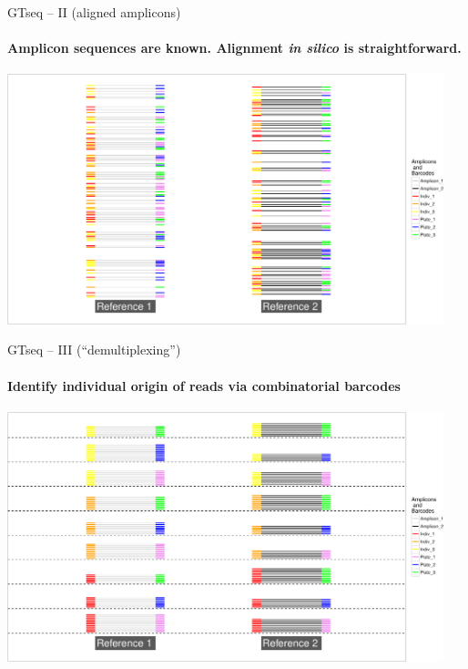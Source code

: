 \documentclass[letter,graphicx]{beamer}
\begin{document}
\begin{frame}{GTseq -- II (aligned amplicons)}
\framesubtitle{Amplicon sequences are known. Alignment {\em in silico} is straightforward.}
\begin{center}
\includegraphics[width=0.95\textwidth]{mhap_figs/gtseq-amps-crop.pdf}
\end{center}
\end{frame}



\begin{frame}{GTseq -- III (``demultiplexing'')}
\framesubtitle{Identify individual origin of reads via combinatorial barcodes}
\begin{center}
\includegraphics[width=0.95\textwidth]{mhap_figs/gtseq-demultiplexed-crop.pdf}
\end{center}
\end{frame}
\end{document}
